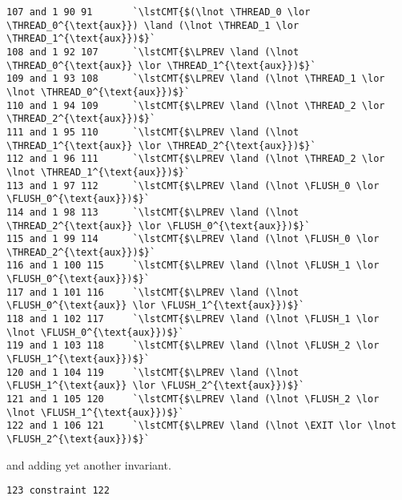 \begin{lstlisting}[style=btor2]
107 and 1 90 91       `\lstCMT{$(\lnot \THREAD_0 \lor \THREAD_0^{\text{aux}}) \land (\lnot \THREAD_1 \lor \THREAD_1^{\text{aux}})$}`
108 and 1 92 107      `\lstCMT{$\LPREV \land (\lnot \THREAD_0^{\text{aux}} \lor \THREAD_1^{\text{aux}})$}`
109 and 1 93 108      `\lstCMT{$\LPREV \land (\lnot \THREAD_1 \lor \lnot \THREAD_0^{\text{aux}})$}`
110 and 1 94 109      `\lstCMT{$\LPREV \land (\lnot \THREAD_2 \lor \THREAD_2^{\text{aux}})$}`
111 and 1 95 110      `\lstCMT{$\LPREV \land (\lnot \THREAD_1^{\text{aux}} \lor \THREAD_2^{\text{aux}})$}`
112 and 1 96 111      `\lstCMT{$\LPREV \land (\lnot \THREAD_2 \lor \lnot \THREAD_1^{\text{aux}})$}`
113 and 1 97 112      `\lstCMT{$\LPREV \land (\lnot \FLUSH_0 \lor \FLUSH_0^{\text{aux}})$}`
114 and 1 98 113      `\lstCMT{$\LPREV \land (\lnot \THREAD_2^{\text{aux}} \lor \FLUSH_0^{\text{aux}})$}`
115 and 1 99 114      `\lstCMT{$\LPREV \land (\lnot \FLUSH_0 \lor \THREAD_2^{\text{aux}})$}`
116 and 1 100 115     `\lstCMT{$\LPREV \land (\lnot \FLUSH_1 \lor \FLUSH_0^{\text{aux}})$}`
117 and 1 101 116     `\lstCMT{$\LPREV \land (\lnot \FLUSH_0^{\text{aux}} \lor \FLUSH_1^{\text{aux}})$}`
118 and 1 102 117     `\lstCMT{$\LPREV \land (\lnot \FLUSH_1 \lor \lnot \FLUSH_0^{\text{aux}})$}`
119 and 1 103 118     `\lstCMT{$\LPREV \land (\lnot \FLUSH_2 \lor \FLUSH_1^{\text{aux}})$}`
120 and 1 104 119     `\lstCMT{$\LPREV \land (\lnot \FLUSH_1^{\text{aux}} \lor \FLUSH_2^{\text{aux}})$}`
121 and 1 105 120     `\lstCMT{$\LPREV \land (\lnot \FLUSH_2 \lor \lnot \FLUSH_1^{\text{aux}})$}`
122 and 1 106 121     `\lstCMT{$\LPREV \land (\lnot \EXIT \lor \lnot \FLUSH_2^{\text{aux}})$}`
\end{lstlisting}
and adding yet another invariant.
\begin{lstlisting}[style=btor2]
123 constraint 122
\end{lstlisting}

